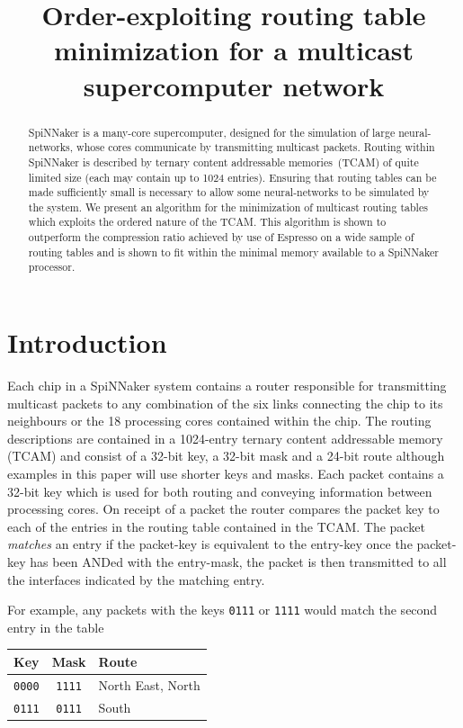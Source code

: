 \documentclass[conference]{IEEEtran}
\title{Order-exploiting routing table minimization for a multicast supercomputer network}
\author{%
  \IEEEauthorblockN{Andrew Mundy and A. N. Other}
  \IEEEauthorblockA{\{\texttt{andrew.mundy}, \texttt{a.n.other}\}\texttt{@manchester.ac.uk}\\
                    School of Computer Science,\\
		    University of Manchester,\\
                    M13 9PL, UK}
}
\newcommand{\mytt}[1]{\texttt{\footnotesize#1}}
\begin{document}
  \maketitle

  \begin{abstract}
    SpiNNaker is a many-core supercomputer, designed for the simulation of large neural-networks, whose cores communicate by transmitting multicast packets.
    Routing within SpiNNaker is described by ternary content addressable memories~(TCAM) of quite limited size (each may contain up to 1024 entries).
    Ensuring that routing tables can be made sufficiently small is necessary to allow some neural-networks to be simulated by the system.
    We present an algorithm for the minimization of multicast routing tables which exploits the ordered nature of the TCAM.
    This algorithm is shown to outperform the compression ratio achieved by use of Espresso on a wide sample of routing tables and is shown to fit within the minimal memory available to a SpiNNaker processor.
  \end{abstract}

  \section{Introduction}

  Each chip in a SpiNNaker system contains a router responsible for transmitting multicast packets to any combination of the six links connecting the chip to its neighbours or the 18 processing cores contained within the chip.
  The routing descriptions are contained in a 1024-entry ternary content addressable memory (TCAM) and consist of a 32-bit key, a 32-bit mask and a 24-bit route although examples in this paper will use shorter keys and masks.
  Each packet contains a 32-bit key which is used for both routing and conveying information between processing cores.
  On receipt of a packet the router compares the packet key to each of the entries in the routing table contained in the TCAM.
  The packet \textit{matches} an entry if the packet-key is equivalent to the entry-key once the packet-key has been ANDed with the entry-mask, the packet is then transmitted to all the interfaces indicated by the matching entry.

  For example, any packets with the keys \mytt{0111} or \mytt{1111} would match the second entry in the table

  \begin{table}[H]
    \centering
    \begin{tabular}{c c l}
      \toprule
      Key & Mask & Route \\
      \midrule
      \texttt{0000} & \texttt{1111} & North East, North \\
      \texttt{0111} & \texttt{0111} & South \\
      \bottomrule
    \end{tabular}
  \end{table}
\end{document}
